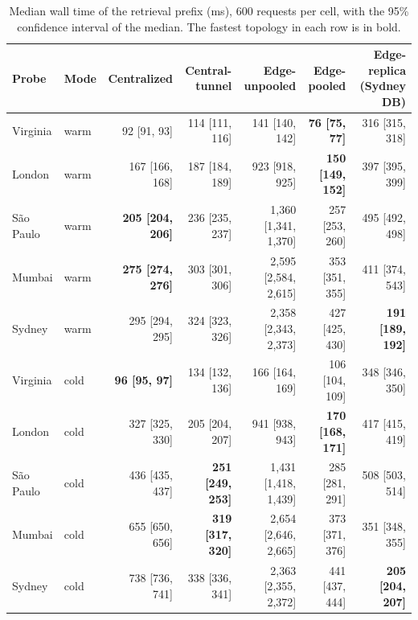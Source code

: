 \documentclass[conference]{IEEEtran}
\begin{document}
\begin{table}[t]
\caption{Median wall time of the retrieval prefix (ms), 600 requests per cell, with the 95\%
confidence interval of the median. The fastest topology in each row is in bold.}
\label{tab:wall}
\centering
\begin{tabular}{@{}l l r r r r r@{}}
\toprule
Probe & Mode & Centralized & Central-tunnel & Edge-unpooled & Edge-pooled & Edge-replica (Sydney DB) \\
\midrule
Virginia   & warm & 92 [91, 93]            & 114 [111, 116] & 141 [140, 142]         & \textbf{76 [75, 77]}    & 316 [315, 318] \\
London     & warm & 167 [166, 168]         & 187 [184, 189] & 923 [918, 925]         & \textbf{150 [149, 152]} & 397 [395, 399] \\
S\~ao Paulo & warm & \textbf{205 [204, 206]} & 236 [235, 237] & 1{,}360 [1{,}341, 1{,}370] & 257 [253, 260]      & 495 [492, 498] \\
Mumbai     & warm & \textbf{275 [274, 276]} & 303 [301, 306] & 2{,}595 [2{,}584, 2{,}615] & 353 [351, 355]      & 411 [374, 543] \\
Sydney     & warm & 295 [294, 295]         & 324 [323, 326] & 2{,}358 [2{,}343, 2{,}373] & 427 [425, 430]      & \textbf{191 [189, 192]} \\
\midrule
Virginia   & cold & \textbf{96 [95, 97]}   & 134 [132, 136] & 166 [164, 169]         & 106 [104, 109]          & 348 [346, 350] \\
London     & cold & 327 [325, 330]         & 205 [204, 207] & 941 [938, 943]         & \textbf{170 [168, 171]} & 417 [415, 419] \\
S\~ao Paulo & cold & 436 [435, 437]         & \textbf{251 [249, 253]} & 1{,}431 [1{,}418, 1{,}439] & 285 [281, 291] & 508 [503, 514] \\
Mumbai     & cold & 655 [650, 656]         & \textbf{319 [317, 320]} & 2{,}654 [2{,}646, 2{,}665] & 373 [371, 376] & 351 [348, 355] \\
Sydney     & cold & 738 [736, 741]         & 338 [336, 341] & 2{,}363 [2{,}355, 2{,}372] & 441 [437, 444]      & \textbf{205 [204, 207]} \\
\bottomrule
\end{tabular}
\end{table}
\end{document}
